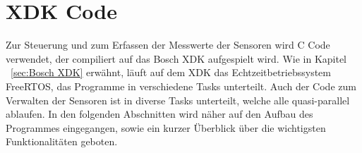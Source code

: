 
\chapter{XDK Code}\label{cha:XDK Code}
Zur Steuerung und zum Erfassen der Messwerte der Sensoren wird C Code verwendet, der compiliert auf das Bosch \acs{XDK} aufgespielt wird. Wie in Kapitel ~\ref{sec:Bosch XDK} erwähnt, läuft auf dem \acs{XDK} das Echtzeitbetriebssystem FreeRTOS, das Programme in verschiedene Tasks unterteilt. Auch der Code zum Verwalten der Sensoren ist in diverse Tasks unterteilt, welche alle quasi-parallel ablaufen.
\newline
In den folgenden Abschnitten wird näher auf den Aufbau des Programmes eingegangen, sowie ein kurzer Überblick über die wichtigsten Funktionalitäten geboten.
